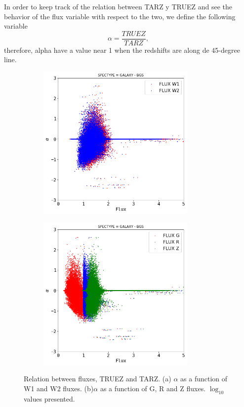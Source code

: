 In order to keep track of the relation between TARZ y TRUEZ and see the behavior of the flux variable with respect to the two, we define the following variable
\begin{equation}
	\alpha = \frac{TRUEZ}{TARZ},
\end{equation}
therefore, alpha have a value near 1 when the redshifts are along de 45-degree line. 
\begin{figure}[!htp]
	\centering
	\begin{subfigure}[t]{0.5\textwidth}
		\centering
		\includegraphics[height=3in]{TeX_files/Imagenes/BGS-FLUXW-ALPHA}
		\caption{}
	\end{subfigure}%
	\begin{subfigure}[t]{0.5\textwidth}
		\centering
		\includegraphics[height=3in]{TeX_files/Imagenes/BGS-FLUXRGZ-ALPHA}
		\caption{}
	\end{subfigure}
	\caption{Relation between fluxes, TRUEZ and TARZ. (a) $\alpha$ as a function of W1 and W2 fluxes. (b)$\alpha$ as a function of G, R and Z fluxes. $\log_{10}$ values presented.}
	\label{fig:BGS-FLUX-ALPHA}
\end{figure} 

